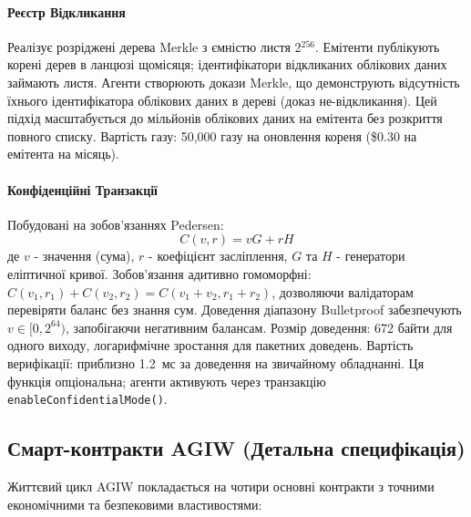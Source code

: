 \documentclass[11pt]{article}
\begin{document}
\paragraph{Реєстр Відкликання} Реалізує розріджені дерева Merkle з ємністю листя 2$^{256}$. Емітенти публікують корені дерев в ланцюзі щомісяця; ідентифікатори відкликаних облікових даних займають листя. Агенти створюють докази Merkle, що демонструють відсутність їхнього ідентифікатора облікових даних в дереві (доказ не-відкликання). Цей підхід масштабується до мільйонів облікових даних на емітента без розкриття повного списку. Вартість газу: 50,000 газу на оновлення кореня (\$0.30 на емітента на місяць).

\paragraph{Конфіденційні Транзакції} Побудовані на зобов'язаннях Pedersen:
\begin{equation}
C(v, r) = vG + rH
\end{equation}
де $v$ - значення (сума), $r$ - коефіцієнт засліплення, $G$ та $H$ - генератори еліптичної кривої. Зобов'язання адитивно гомоморфні: $C(v_1, r_1) + C(v_2, r_2) = C(v_1 + v_2, r_1 + r_2)$, дозволяючи валідаторам перевіряти баланс без знання сум. Доведення діапазону Bulletproof забезпечують $v \in [0, 2^{64})$, запобігаючи негативним балансам. Розмір доведення: 672 байти для одного виходу, логарифмічне зростання для пакетних доведень. Вартість верифікації: приблизно 1.2~мс за доведення на звичайному обладнанні. Ця функція опціональна; агенти активують через транзакцію \texttt{enableConfidentialMode()}.

\subsection{Смарт-контракти AGIW (Детальна специфікація)}
\label{sec:agiw-contracts}
Життєвий цикл AGIW покладається на чотири основні контракти з точними економічними та безпековими властивостями:
\end{document}
